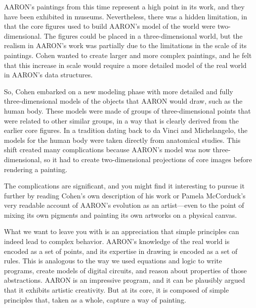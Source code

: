 AARON's paintings from this time represent a high point in its work, and they
have been exhibited in museums. 
Nevertheless, there was a hidden limitation, in that the core figures
used to build AARON's model of the world were two-dimensional. The figures could be
placed in a three-dimensional world, but the realism in AARON's work was partially
due to the limitations in the scale of its paintings. Cohen wanted to create larger
and more complex paintings, and he felt that this increase in scale would require a
more detailed model of the real world in AARON's data structures.

So, Cohen embarked on a new modeling phase with more detailed and fully
three-dimensional models of the objects that AARON would draw, such as the human
body. These models were made of groups of three-dimensional points that were
related to other similar groups, in a way that is clearly derived from the earlier
core figures. In a tradition dating back to da Vinci and Michelangelo, the models
for the human body were taken directly from anatomical studies. This shift
created many complications because AARON's model was now three-dimensional,
so it had to create two-dimensional projections of core images before rendering a
painting.

The complications are significant, and you might find it interesting to pursue
it further by reading Cohen's own description
of his work or Pamela McCorduck's 
very readable account of AARON's evolution as an
artist---even to the point of mixing its own pigments and painting its own artworks
on a physical canvas. 

What we want to leave you with is an appreciation that
simple principles can indeed lead to complex behavior. 
AARON's knowledge of the real world is encoded as a set of points, 
and its expertise in drawing is encoded as a set of rules. 
This is analogous to the way we used equations and logic to write programs,
create models of digital circuits, and reason about properties of those abstractions.
AARON is an impressive program, and it can be plausibly argued that it exhibits
artistic creativity. But at its core, it is
composed of simple principles that, taken as a whole, capture a way of painting.

